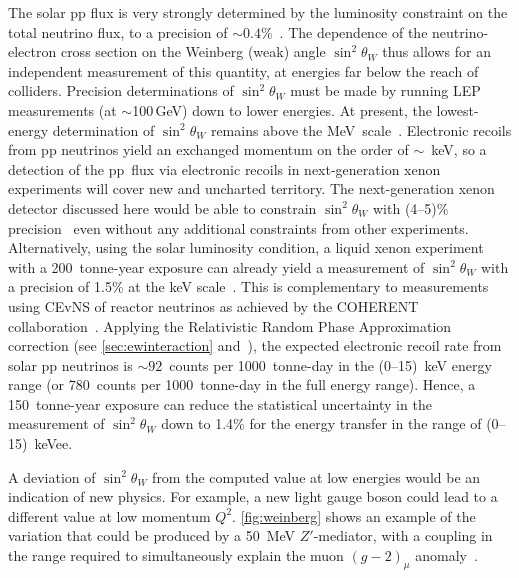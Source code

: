 The solar pp flux is very strongly determined by the luminosity constraint on the total neutrino flux, to a precision of $\sim 0.4$\%~\cite{Bergstrom:2016cbh}. The dependence of the neutrino-electron cross section on the Weinberg (weak) angle $\sin^2\theta_W$ thus allows for an independent measurement of this quantity, at energies far below the reach of colliders. Precision determinations of $\sin^2\theta_W$ must be made by running LEP measurements (at $\sim$100\,GeV) down to lower energies. At present, the lowest-energy determination of $\sin^2 \theta_W$ remains above the MeV~scale~\cite{Bouchiat:1983uf}. Electronic recoils from pp neutrinos yield an exchanged momentum on the order of $\sim$~keV, so a detection of the pp~flux via electronic recoils in next-generation xenon experiments will cover new and uncharted territory. The next-generation xenon detector discussed here would be able to constrain $\sin^2 \theta_W$ with (4--5)\% precision~\cite{Aalbers:2020gsn} even without any additional constraints from other experiments. Alternatively, using the solar luminosity condition, a liquid xenon experiment with a 200~tonne-year exposure can already yield a measurement of $\sin^2 \theta_W$ with a precision of 1.5\% at the keV scale~\cite{Cerdeno:2016sfi}. This is complementary to measurements using CEvNS of reactor neutrinos as achieved by the COHERENT collaboration~\cite{Cadeddu:2019eta}. Applying the Relativistic Random Phase Approximation correction (see \autoref{sec:ewinteraction} and~\cite{Chen:2016eab}), the expected electronic recoil rate from solar pp neutrinos is $\sim 92$~counts per 1000~tonne-day in the (0--15)~keV energy range (or 780~counts per 1000~tonne-day in the full energy range). Hence, a 150~tonne-year exposure can reduce the statistical uncertainty in the measurement of $\sin^2 \theta_W$ down to 1.4\% for the energy transfer in the range of (0--15)~keVee. 

A deviation of $\sin^2 \theta_W$ from the computed value at low energies would be an indication of new physics. For example, a new light gauge boson could lead to a different value at low momentum $Q^2$. \autoref{fig:weinberg} shows an example of the variation that could be produced by a 50~MeV $Z'$-mediator, with a coupling in the range required to simultaneously explain the muon $(g - 2)_\mu$ anomaly~\cite{Davoudiasl:2014kua}.

